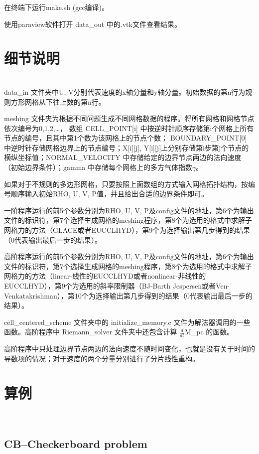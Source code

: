 \documentclass{article}
\begin{document}
在终端下运行make.sh (gcc编译)。

使用paraview软件打开 data\_out 中的.vtk文件查看结果。

\section{细节说明}
\ \\

data\_in 文件夹中U, V分别代表速度的x轴分量和y轴分量。初始数据的第n行为规则方形网格从下往上数的第n行。

meshing 文件夹为根据不同问题生成不同网格数据的程序。将所有网格和网格节点依次编号为0,1,2,\ldots， 数组 CELL\_POINT[i] 中按逆时针顺序存储第i个网格上所有节点的编号，且其中第1个数为该网格上的节点个数； BOUNDARY\_POINT[0] 中逆时针存储网格边界上的节点编号；X[i][j], Y[i][j]上分别存储第i步第j个节点的横纵坐标值；NORMAL\_VELOCITY 中存储给定的边界节点两边的法向速度（初始边界条件）；gamma 中存储每个网格上的多方气体指数$\gamma$。

如果对于不规则的多边形网格，只要按照上面数组的方式输入网格拓扑结构，按编号顺序输入初始RHO, U, V, P值，并且给出合适的边界条件即可。

一阶程序运行的前5个参数分别为RHO, U, V, P及config文件的地址，第6个为输出文件的标识符，第7个选择生成网格的meshing程序，第8个为选用的格式中求解子网格力的方法（GLACE或者EUCCLHYD），第9个为选择输出第几步得到的结果（0代表输出最后一步的结果）。

高阶程序运行的前5个参数分别为RHO, U, V, P及config文件的地址，第6个为输出文件的标识符，第7个选择生成网格的meshing程序，第8个为选用的格式中求解子网格力的方法（linear-线性的EUCCLHYD或者nonlinear-非线性的EUCCLHYD），第9个为选用的斜率限制器（BJ-Barth Jespersen或者Ven-Venkatakrishman），第10个为选择输出第几步得到的结果（0代表输出最后一步的结果）。

cell\_centered\_scheme 文件夹中的 initialize\_memory.c 文件为解法器调用的一些函数。高阶程序中 Riemann\_solver 文件夹中还包含计算 $\frac{d}{dt}$M\_pc 的函数。

高阶程序中只处理边界节点两边的法向速度不随时间变化，也就是没有关于时间的导数项的情况；对于速度的两个分量分别进行了分片线性重构。

\section{算例}
\ \\

\subsection{CB--Checkerboard problem}
\ \\
\end{document}
